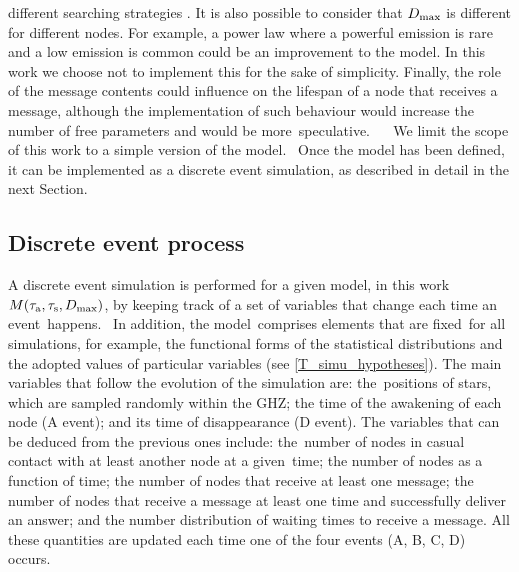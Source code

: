 \documentclass[crop]{CSLB}
\newcommand{\ceti}{node}
\newcommand{\cetis}{nodes}
\begin{document}
different searching strategies \citep{hippke_interstellar_2017}. 
%
It is also possible to consider that $D_{\rm max}$ is different for different
\cetis{}.
%
For example, a power law where a powerful emission is rare and a low emission
is common could be an improvement to the model.
%
In this work we choose not to implement this for the sake of simplicity.
%
Finally, the role of the message contents could influence on the lifespan of a
\ceti{} that receives a message, although the implementation of such behaviour
would increase the number of free parameters and would be more speculative.   
%
We limit the scope of this work to a simple version of the model. 
%
Once the model has been defined, it can be implemented as a discrete event
simulation, as described in detail in the next Section.


\subsection{Discrete event process}

A discrete event simulation is performed for a given model, in this
work $M(\tau_{\rm a}, \tau_{\rm s},
D_{\rm max})$, by keeping track of a set of variables that change each time an
event happens. 
%
In addition, the model comprises elements that are fixed for all simulations,
for example, the functional forms of the statistical distributions and the
adopted values of particular variables (see \ref{T_simu_hypotheses}).
%
The main variables that follow the evolution of the simulation are:
the positions of stars, which are sampled randomly within the GHZ; the time of
the awakening of each node (A event); and its time of disappearance (D event).
%
The variables that can be deduced from the previous ones include: the number of
\cetis{} in casual contact with at least another \ceti{} at a given time; the
number of \cetis{} as a function of time; the number of \cetis{} that receive at
least one message; the number of \cetis{} that receive a message at
least one time and successfully deliver an answer; and the number distribution
of waiting times to receive a message.
%
All these quantities are updated each time one of the four events (A, B, C, D)
occurs.   
\end{document}
